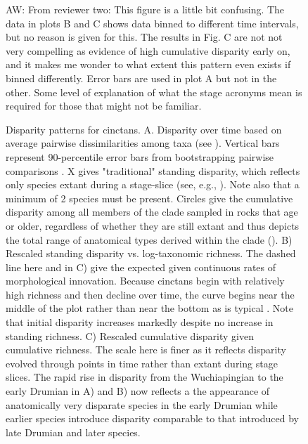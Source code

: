 \documentclass{article}
\newcommand{\amw}[1]{{\textcolor{OliveGreen}{AW: #1}}} %
\begin{document}
\begin{figure}
  \caption{Disparity patterns for cinctans.  A. Disparity over time based on average pairwise dissimilarities among taxa (see \cite{Foote1992}).  Vertical bars represent 90-percentile error bars from bootstrapping pairwise comparisons \citep{Foote1993}.  X gives "traditional" standing disparity, which reflects only species extant during a stage-slice (see, e.g., \citep{Hughes2013}).  Note also that a minimum of 2 species must be present. Circles give the cumulative disparity among all members of the clade sampled in rocks that age or older, regardless of whether they are still extant and thus depicts the total range of anatomical types derived within the clade (\citep{Wagner2015}).  B) Rescaled standing disparity vs. log-taxonomic richness. The dashed line here and in C) give the expected given continuous rates of morphological innovation.  Because cinctans begin with relatively high richness and then decline over time, the curve begins near the middle of the plot rather than near the bottom as is typical \citep{Jablonski2020}. Note that initial disparity increases markedly despite no increase in standing richness. C) Rescaled cumulative disparity given cumulative richness.  The scale here is finer as it reflects disparity evolved through points in time rather than extant during stage slices. The rapid rise in disparity from the Wuchiapingian to the early Drumian in A) and B) now reflects a the appearance of anatomically very disparate species in the early Drumian while earlier species introduce disparity comparable to that introduced by late Drumian and later species.}
  \amw{From reviewer two: This figure is a little bit confusing.
The data in plots B and C shows data binned to different time intervals, but no reason is given for this.
The results in Fig. C are not not very compelling as evidence of high cumulative disparity early on, and it makes me wonder to what extent this pattern even exists if binned differently. 
Error bars are used in plot A but not in the other.
Some level of explanation of what the stage acronyms mean is required for those that might not be familiar.}
\end{figure}
\end{document}
